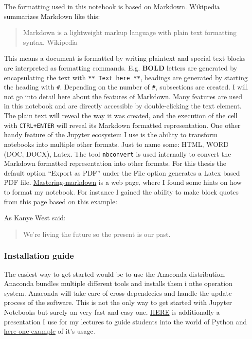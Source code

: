\documentclass[11pt]{article}
\begin{document}
The formatting used in this notebook is based on Markdown. Wikipedia
summarizes Markdown like this:

\begin{quote}
Markdown is a lightweight markup language with plain text formatting
syntax. Wikipedia
\end{quote}

This means a document is formatted by writing plaintext and special text
blocks are interpreted as formatting commands. E.g. \textbf{BOLD}
letters are generated by encapsulating the text with
\texttt{**\ Text\ here\ **}, headings are generated by starting the
heading with \texttt{\#}. Depending on the number of \texttt{\#},
subsections are created. I will not go into detail here about the
features of Markdown. Many features are used in this notebook and are
directly accessible by double-clicking the text element. The plain text
will reveal the way it was created, and the execution of the cell with
\texttt{CTRL+ENTER} will reveal its Markdown formatted representation.
One other handy feature of the Jupyter ecosystem I use is the ability to
transform notebooks into multiple other formats. Just to name some:
HTML, WORD (DOC, DOCX), Latex. The tool \texttt{nbconvert} is used
internally to convert the Markdown formatted representation into other
formats. For this thesis the default option ``Export as PDF'' under the
File option generates a Latex based PDF file.
\href{https://guides.github.com/features/mastering-markdown/}{Mastering-markdown}
is a web page, where I found some hints on how to format my notebook.
For instance I gained the ability to make block quotes from this page
based on this example:

As Kanye West said:

\begin{quote}
We're living the future so the present is our past.
\end{quote}

    \hypertarget{installation-guide}{%
\subsubsection{Installation guide}\label{installation-guide}}

The easiest way to get started would be to use the Anaconda
distribution. Anaconda bundles multiple different tools and installs
them i nthe operation system. Anaconda will take care of cross
dependecies and handle the update process of the software. This is not
the only way to get started with Jupyter Notebooks but surely an very
fast and easy one.
\href{media/presentations/InstallAnaconda/Anaconda-Python.pdf}{HERE} is
additionally a presentation I use for my lectures to guide students into
the world of Python and
\href{media/presentations/InstallAnaconda/PythonÜbung.zip}{here one
example} of it's usage.
\end{document}
